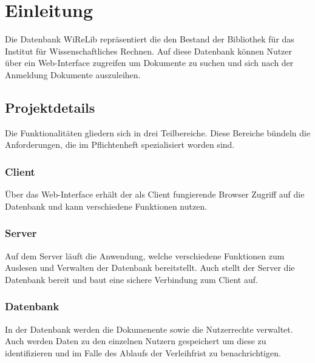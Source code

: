 
\chapter{Einleitung}
Die Datenbank WiReLib repräsentiert die den Bestand der Bibliothek für das Institut für Wissenschaftliches Rechnen.
Auf diese Datenbank können Nutzer über ein Web-Interface zugreifen um Dokumente zu suchen und sich nach der Anmeldung Dokumente auszuleihen.

\section{Projektdetails}
Die Funktionalitäten gliedern sich in drei Teilbereiche.
Diese Bereiche bündeln die Anforderungen, die im Pflichtenheft spezialisiert
worden sind.


\subsection{Client}
Über das Web-Interface erhält der als Client fungierende Browser Zugriff auf die Datenbank und kann verschiedene Funktionen nutzen.

\subsection{Server}
Auf dem Server läuft die Anwendung, welche verschiedene Funktionen zum Auslesen und Verwalten der Datenbank bereitstellt. 
Auch stellt der Server die Datenbank bereit und baut eine sichere Verbindung zum Client auf.

\subsection{Datenbank}
In der Datenbank werden die Dokumenente sowie die Nutzerrechte verwaltet.
Auch werden Daten zu den einzelnen Nutzern gespeichert um diese zu identifizieren und im Falle des Ablaufs der Verleihfrist zu benachrichtigen.
